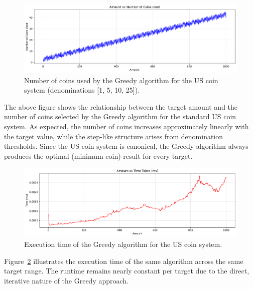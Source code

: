 \documentclass[12pt,a4paper]{report}
\begin{document}
\begin{figure}[H]
  \centering
  \includegraphics[width=\textwidth]{graphs/greedy_coins_standard_plot.pdf}
  \caption{Number of coins used by the Greedy algorithm for the US coin system (denominations [1, 5, 10, 25]).}
  \label{fig:greedy_coins_standard_plot}
\end{figure}

The above figure shows the relationship between the target amount and the number of coins selected by the Greedy algorithm for the standard US coin system. As expected, the number of coins increases approximately linearly with the target value, while the step-like structure arises from denomination thresholds. Since the US coin system is canonical, the Greedy algorithm always produces the optimal (minimum-coin) result for every target.

\begin{figure}[H]
  \centering
  \includegraphics[width=\textwidth]{graphs/greedy_time_standard_plot.pdf}
  \caption{Execution time of the Greedy algorithm for the US coin system.}
  \label{fig:greedy_time_standard_plot}
\end{figure}

Figure~\ref{fig:greedy_time_standard_plot} illustrates the execution time of the same algorithm across the same target range. The runtime remains nearly constant per target due to the direct, iterative nature of the Greedy approach.
\end{document}
